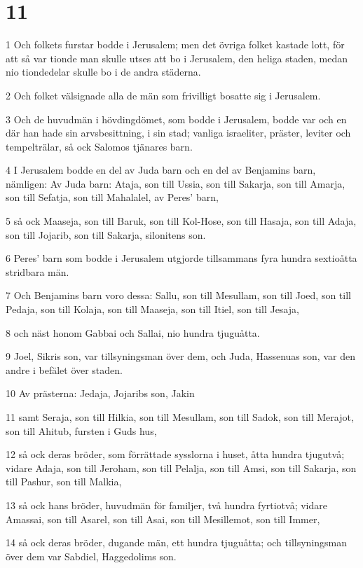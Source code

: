 \chapter{11}

\par 1 Och folkets furstar bodde i Jerusalem; men det övriga folket kastade lott, för att så var tionde man skulle utses att bo i Jerusalem, den heliga staden, medan nio tiondedelar skulle bo i de andra städerna.
\par 2 Och folket välsignade alla de män som frivilligt bosatte sig i Jerusalem.
\par 3 Och de huvudmän i hövdingdömet, som bodde i Jerusalem, bodde var och en där han hade sin arvsbesittning, i sin stad; vanliga israeliter, präster, leviter och tempelträlar, så ock Salomos tjänares barn.
\par 4 I Jerusalem bodde en del av Juda barn och en del av Benjamins barn, nämligen: Av Juda barn: Ataja, son till Ussia, son till Sakarja, son till Amarja, son till Sefatja, son till Mahalalel, av Peres' barn,
\par 5 så ock Maaseja, son till Baruk, son till Kol-Hose, son till Hasaja, son till Adaja, son till Jojarib, son till Sakarja, silonitens son.
\par 6 Peres' barn som bodde i Jerusalem utgjorde tillsammans fyra hundra sextioåtta stridbara män.
\par 7 Och Benjamins barn voro dessa: Sallu, son till Mesullam, son till Joed, son till Pedaja, son till Kolaja, son till Maaseja, son till Itiel, son till Jesaja,
\par 8 och näst honom Gabbai och Sallai, nio hundra tjuguåtta.
\par 9 Joel, Sikris son, var tillsyningsman över dem, och Juda, Hassenuas son, var den andre i befälet över staden.
\par 10 Av prästerna: Jedaja, Jojaribs son, Jakin
\par 11 samt Seraja, son till Hilkia, son till Mesullam, son till Sadok, son till Merajot, son till Ahitub, fursten i Guds hus,
\par 12 så ock deras bröder, som förrättade sysslorna i huset, åtta hundra tjugutvå; vidare Adaja, son till Jeroham, son till Pelalja, son till Amsi, son till Sakarja, son till Pashur, son till Malkia,
\par 13 så ock hans bröder, huvudmän för familjer, två hundra fyrtiotvå; vidare Amassai, son till Asarel, son till Asai, son till Mesillemot, son till Immer,
\par 14 så ock deras bröder, dugande män, ett hundra tjuguåtta; och tillsyningsman över dem var Sabdiel, Haggedolims son.

